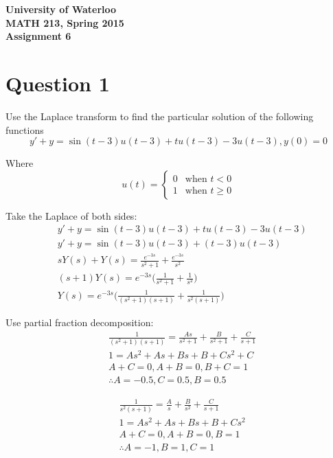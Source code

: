 \documentclass[12pt]{article}
\begin{document}
\begin{center}
{\Large\bf University of Waterloo}\\
\vspace{3mm}
{\Large\bf MATH 213, Spring 2015}\\
\vspace{2mm}
{\Large\bf Assignment 6}\\
\end{center}

\section*{Question 1}

Use the Laplace transform to find the particular solution of the following functions
$$y' + y = \sin(t - 3)u(t - 3) + tu(t - 3) - 3u(t - 3), y(0) = 0$$


\noindent Where
\[
 u(t) =
  \begin{cases}
    0 &\text{when } t < 0 \\
    1 &\text{when } t \ge 0
  \end{cases}
\]

Take the Laplace of both sides:
\begin{align*}
  &y' + y = \sin(t - 3)u(t - 3) + tu(t - 3) - 3u(t - 3)
  \\ &y' + y = \sin(t - 3)u(t - 3) + (t - 3)u(t - 3)
  \\ &sY(s) + Y(s) = \frac{e^{-3s}}{s^2 + 1} + \frac{e^{-3s}}{s^2}
  \\ &(s + 1)Y(s) = e^{-3s}\bigg(\frac{1}{s^2 + 1} + \frac{1}{s^2}\bigg)
  \\ &Y(s) = e^{-3s}\bigg(\frac{1}{(s^2 + 1)(s + 1)} + \frac{1}{s^2(s + 1)}\bigg) \tag{1 mark}
\end{align*}

Use partial fraction decomposition:
\begin{align*}
  &\frac{1}{(s^2 + 1)(s + 1)} = \frac{As}{s^2 + 1} + \frac{B}{s^2 + 1} + \frac{C}{s + 1}
  \\&1 = As^2 + As + Bs + B + Cs^2 + C
  \\& A + C = 0, A + B = 0, B + C = 1
    \\& \therefore A = -0.5, C = 0.5, B = 0.5 \tag{1 mark}
\end{align*}

\begin{align*}
  &\frac{1}{s^2(s + 1)} = \frac{A}{s} + \frac{B}{s^2} + \frac{C}{s + 1}
  \\&1 = As^2 + As + Bs + B + Cs^2
  \\& A + C = 0, A + B = 0, B = 1
    \\& \therefore A = -1, B = 1, C = 1 \tag{1 mark}
\end{align*}
\end{document}
